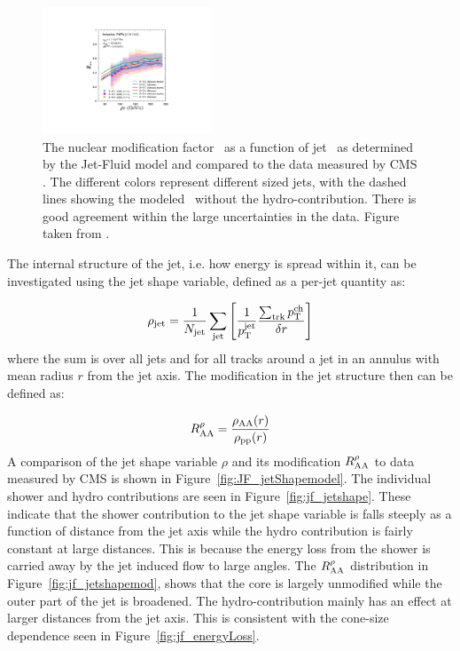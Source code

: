 \begin{figure}[htbp]
\begin{center}
\includegraphics[width=0.45\textwidth]{figures/jetMeasurements/JF_RAA}
\caption{The nuclear modification factor \RAA\ as a function of jet \pt\ as determined by the Jet-Fluid model and compared to the data measured by CMS \cite{Khachatryan:2016jfl}. The different colors represent different sized jets, with the dashed lines showing the modeled \RAA\ without the hydro-contribution. There is good agreement within the large uncertainties in the data. Figure taken from \cite{Tachibana:2017syd}.}
\label{fig:jf_raa}
\end{center}
\end{figure}


The internal structure of the jet, i.e. how energy is spread within it, can be investigated using the jet shape variable, defined as a per-jet quantity as:

\begin{align}
\rho_{\rm jet} = \frac{1}{\mbox{$N_{\mathrm{jet}}$}} \sum_{\rm jet} \left[ \frac{1}{\mbox{$p_{\mathrm{T}}^{\mathrm{jet}}$}} \frac{\sum_{\rm trk} \mbox{$p_{\mathrm{T}}^{\mathrm{ch}}$}}{\delta r}  \right]
\end{align}
where the sum is over all jets and for all tracks around a jet in an annulus with mean radius $r$ from the jet axis. The modification in the jet structure then can be defined as:

\begin{align}
R_{\rm AA}^\rho = \dfrac{\rho_{\rm AA} (r) }{\rho_{\rm pp} (r) }
\end{align}
A comparison of the jet shape variable $\rho$ and its modification $R_{\rm AA}^\rho$ to data measured by CMS is shown in Figure~\ref{fig:JF_jetShapemodel}. The individual shower and hydro contributions are seen in Figure~\ref{fig:jf_jetshape}. These indicate that the shower contribution to the jet shape variable is falls steeply as a function of distance from the jet axis while the hydro contribution is fairly constant at large distances. This is because the energy loss from the shower is carried away by the jet induced flow to large angles.
The $R_{\rm AA}^\rho$ distribution in Figure~\ref{fig:jf_jetshapemod}, shows that the core is largely unmodified while the outer part of the jet is broadened. The hydro-contribution mainly has an effect at larger distances from the jet axis. This is consistent with the cone-size dependence seen in Figure~\ref{fig:jf_energyLoss}.


